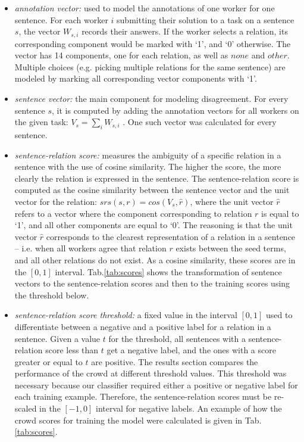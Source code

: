 \begin{itemize}

\item \textit{annotation vector:} used to model the annotations of one worker for one sentence.  For each worker $i$ submitting their solution to a task on a sentence $s$, the vector $W_{s,i}$ records their answers. If the worker selects a relation, its corresponding component would be marked with `1', and `0' otherwise.  The vector has 14 components, one for each relation, as well as $none$ and $other$. Multiple choices (e.g. picking multiple relations for the same sentence) are modeled by marking all corresponding vector components with `1'.

\item \textit{sentence vector:} the main component for modeling disagreement.  For every sentence $s$, it is computed by adding the annotation vectors for all workers on the given task: $V_{s} = \sum_{i}{W_{s,i}}$ .  One such vector was calculated for every sentence.   

\item \textit{sentence-relation score:} measures the ambiguity of a specific relation in a sentence with the use of cosine similarity. The higher the score, the more clearly the relation is expressed in the sentence. The sentence-relation score is computed as the cosine similarity between the sentence vector and the unit vector for the relation: $ srs(s, r) = cos(V_s, \hat{r}) $, where the unit vector $\hat{r}$ refers to a vector where the component corresponding to relation $r$ is equal to `1', and all other components are equal to `0'. The reasoning is that the unit vector $\hat{r}$ corresponds to the clearest representation of a relation in a sentence -- i.e. when all workers agree that relation $r$ exists between the seed terms, and all other relations do not exist. As a cosine similarity, these scores are in the $[0, 1]$ interval.  Tab.\ref{tab:scores} shows the transformation of sentence vectors to the sentence-relation scores and then to the training scores using the threshold below.

\item \textit{sentence-relation score threshold:} a fixed value in the interval $[0, 1]$ used to differentiate between a negative and a positive label for a relation in a sentence. Given a value $t$ for the threshold, all sentences with a sentence-relation score less than $t$ get a negative label, and the ones with a score greater or equal to $t$ are positive. The results section compares the performance of the crowd at different threshold values. This threshold was necessary because our classifier required either a positive or negative label for each training example. Therefore, the sentence-relation scores must be re-scaled in the $[-1, 0]$ interval for negative labels. An example of how the crowd scores for training the model were calculated is given in Tab.\ref{tab:scores}.

\end{itemize}

